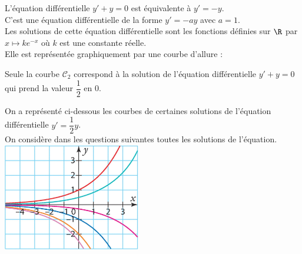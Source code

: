 \documentclass[a4paper,11pt,exos]{nsi} %
\begin{document}
\textcolor{UGLiBlue}{
    L'équation différentielle $y'+y=0$ est équivalente à $y'=-y$.\\
    C'est une équation différentielle de la forme $y'=-ay$ avec $a=1$.\\
    Les solutions de cette équation différentielle sont les fonctions définies sur $\R$ par $x\mapsto ke^{-x}$ où $k$ est une constante réelle.\\
    Elle est représentée graphiquement par une courbe d'allure :
    \begin{center}
    \end{center}
    Seule la courbe $\mathcal{C}_2$ correspond à la solution de l'équation différentielle $y'+y=0$ qui prend la valeur $\dfrac{1}{2}$ en $0$.
}

\exo{}
On a représenté ci-dessous les courbes de certaines solutions de l'équation différentielle $y'=\dfrac{1}{2}y$.\\
On considère dans les questions suivantes toutes les solutions de l'équation.\\[.5em]
{\includegraphics[width=6cm]{courbes2.jpg}}
\end{document}
